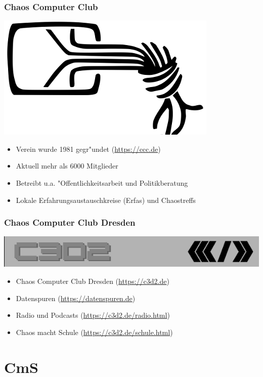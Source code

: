 \documentclass[12pt, table]{beamer}
\begin{document}
\begin{frame}
	\frametitle{Chaos Computer Club}
	\begin{center}
		\includegraphics[height=0.2\textheight]{../img/chaosknoten.png}
	\end{center}	
	\begin{itemize}
		\item<1-> Verein wurde 1981 gegr"undet (\url{https://ccc.de})          
		\item<2-> Aktuell mehr als 6000 Mitglieder
		\item<3-> Betreibt u.a. "Offentlichkeitsarbeit und Politikberatung      
		\item<4-> Lokale Erfahrungsaustauschkreise (Erfas) und Chaostreffs
	\end{itemize}
\end{frame}

\begin{frame}
	\frametitle{Chaos Computer Club Dresden}
	\begin{center}
		\includegraphics[height=0.1\textheight]{../img/c3d2_logo.png}
	\end{center}
	\begin{itemize}
		\item<1-> Chaos Computer Club Dresden (\url{https://c3d2.de})          
		\item<2-> Datenspuren (\url{https://datenspuren.de})
		\item<3-> Radio und Podcasts (\url{https://c3d2.de/radio.html})
		\item<4-> Chaos macht Schule (\url{https://c3d2.de/schule.html})
	\end{itemize}
\end{frame}
  
\section{CmS}
\end{document}
